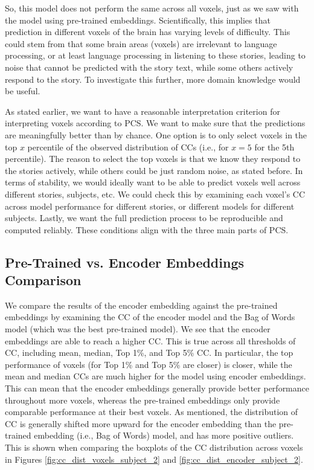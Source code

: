 \documentclass[10pt,letterpaper]{article}
\begin{document}
So, this model does not perform the same across all voxels, just as we saw with the model using pre-trained embeddings. Scientifically, this implies that prediction in different voxels of the brain has varying levels of difficulty. This could stem from that some brain areas (voxels) are irrelevant to language processing, or at least language processing in listening to these stories, leading to noise that cannot be predicted with the story text, while some others actively respond to the story. To investigate this further, more domain knowledge would be useful.

As stated earlier, we want to have a reasonable interpretation criterion for interpreting voxels according to PCS. We want to make sure that the predictions are meaningfully better than by chance. One option is to only select voxels in the top \(x\) percentile of the observed distribution of CCs (i.e., for \(x=5\) for the 5th percentile). The reason to select the top voxels is that we know they respond to the stories actively, while others could be just random noise, as stated before. In terms of stability, we would ideally want to be able to predict voxels well across different stories, subjects, etc. We could check this by examining each voxel's CC across model performance for different stories, or different models for different subjects. Lastly, we want the full prediction process to be reproducible and computed reliably. These conditions align with the three main parts of PCS.


\subsection{Pre-Trained vs. Encoder Embeddings Comparison}

We compare the results of the encoder embedding against the pre-trained embeddings by examining the CC of the encoder model and the Bag of Words model (which was the best pre-trained model). We see that the encoder embeddings are able to reach a higher CC. This is true across all thresholds of CC, including mean, median, Top 1\%, and Top 5\% CC. In particular, the top performance of voxels (for Top 1\% and Top 5\% are closer) is closer, while the mean and median CCs are much higher for the model using encoder embeddings. This can mean that the encoder embeddings generally provide better performance throughout more voxels, whereas the pre-trained embeddings only provide comparable performance at their best voxels. As mentioned, the distribution of CC is generally shifted more upward for the encoder embedding than the pre-trained embedding (i.e., Bag of Words) model, and has more positive outliers. This is shown when comparing the boxplots of the CC distribution across voxels in Figures \ref{fig:cc_dist_voxels_subject_2} and \ref{fig:cc_dist_encoder_subject_2}.
\end{document}
